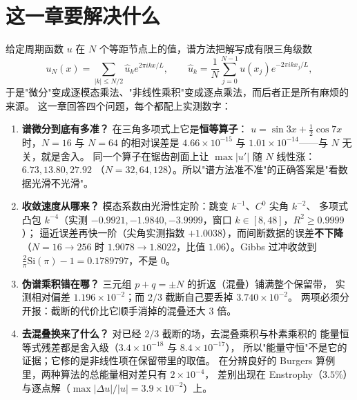 % 


\section{这一章要解决什么}

给定周期函数 $u$ 在 $N$ 个等距节点上的值，谱方法把解写成有限三角级数
\[
u_N(x)=\sum_{|k|\le N/2}\hat u_k e^{2\pi i kx/L},\qquad
\hat u_k=\frac1N\sum_{j=0}^{N-1}u(x_j)e^{-2\pi i kx_j/L},
\]
于是"微分"变成逐模态乘法、"非线性乘积"变成逐点乘法，而后者正是所有麻烦的来源。
这一章回答四个问题，每个都配上实测数字：

\begin{enumerate}
  \item \textbf{谱微分到底有多准？} 在三角多项式上它是\textbf{恒等算子}：
        $u=\sin 3x+\tfrac12\cos 7x$ 时，$N=16$ 与 $N=64$ 的相对误差是
        $4.66\times10^{-15}$ 与 $1.01\times10^{-14}$——与 $N$ 无关，就是舍入。
        同一个算子在锯齿剖面上让 $\max|u'|$ 随 $N$ 线性涨：$6.73,13.80,27.92$
        （$N=32,64,128$）。所以"谱方法准不准"的正确答案是"看数据光滑不光滑"。
  \item \textbf{收敛速度从哪来？} 模态系数由光滑性定阶：跳变 $k^{-1}$、$C^0$ 尖角 $k^{-2}$、
        多项式凸包 $k^{-4}$（实测 $-0.9921,-1.9840,-3.9999$，窗口 $k\in[8,48]$，$R^2\ge0.9999$）；
        逼近误差再快一阶（尖角实测指数 $+1.0038$），而间断数据的误差\textbf{不下降}
        （$N=16\to256$ 时 $1.9078\to1.8022$，比值 $1.06$）。Gibbs 过冲收敛到
        $\frac2\pi\mathrm{Si}(\pi)-1=0.1789797$，不是 $0$。
  \item \textbf{伪谱乘积错在哪？} 三元组 $p+q=\pm N$ 的折返（混叠）铺满整个保留带，
        实测相对偏差 $1.196\times10^{-2}$；而 $2/3$ 截断自己要丢掉 $3.740\times10^{-2}$。
        两项必须分开报：截断的代价比它顺手消掉的混叠还大 $3$ 倍。
  \item \textbf{去混叠换来了什么？} 对已经 $2/3$ 截断的场，去混叠乘积与朴素乘积的
        能量恒等式残差都是舍入级（$3.4\times10^{-18}$ 与 $8.4\times10^{-17}$），
        所以"能量守恒"不是它的证据；它修的是非线性项在保留带里的取值。
        在分辨良好的 Burgers 算例里，两种算法的总能量相对差只有 $2\times10^{-4}$，
        差别出现在 Enstrophy（$3.5\%$）与逐点解（$\max|\Delta u|/|u|=3.9\times10^{-2}$）上。
\end{enumerate}

